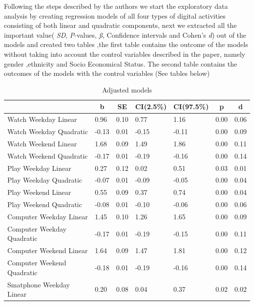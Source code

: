 \documentclass[floatsintext,man]{apa6}
\theoremstyle{definition}
\theoremstyle{definition}
\theoremstyle{definition}
\theoremstyle{remark}
\begin{document}
Following the steps described by the authors we start the exploratory
data analysis by creating regression models of all four types of digital
activities consisting of both linear and quadratic components, next we
extracted all the important value( \emph{SD}, \emph{P}-values, \emph{ß},
Confidence intervals and Cohen's \emph{d}) out of the models and created
two tables ,the first table contains the outcome of the models without
taking into account the control variables described in the paper, namely
gender ,ethnicity and Socio Economical Status. The second table contains
the outcomes of the models with the control variables (See tables below)

\begin{table}[tbp]
\begin{center}
\begin{threeparttable}
\caption{\label{tab:unnamed-chunk-1}Adjusted models}
\begin{tabular}{lllllll}
\toprule
 & \multicolumn{1}{c}{b} & \multicolumn{1}{c}{SE} & \multicolumn{1}{c}{CI(2.5\%)} & \multicolumn{1}{c}{CI(97.5\%)} & \multicolumn{1}{c}{p} & \multicolumn{1}{c}{d}\\
\midrule
Watch Weekday Linear & 0.96 & 0.10 & 0.77 & 1.16 & 0.00 & 0.06\\
Watch Weekday Quadratic & -0.13 & 0.01 & -0.15 & -0.11 & 0.00 & 0.09\\
Watch Weekend Linear & 1.68 & 0.09 & 1.49 & 1.86 & 0.00 & 0.11\\
Watch Weekend Quadratic & -0.17 & 0.01 & -0.19 & -0.16 & 0.00 & 0.14\\
Play Weekday Linear & 0.27 & 0.12 & 0.02 & 0.51 & 0.03 & 0.01\\
Play Weekday Quadratic & -0.07 & 0.01 & -0.09 & -0.05 & 0.00 & 0.04\\
Play Weekend Linear & 0.55 & 0.09 & 0.37 & 0.74 & 0.00 & 0.04\\
Play Weekend Quadratic & -0.08 & 0.01 & -0.10 & -0.06 & 0.00 & 0.06\\
Computer Weekday Linear & 1.45 & 0.10 & 1.26 & 1.65 & 0.00 & 0.09\\
Computer Weekday Quadratic & -0.17 & 0.01 & -0.19 & -0.15 & 0.00 & 0.11\\
Computer Weekend Linear & 1.64 & 0.09 & 1.47 & 1.81 & 0.00 & 0.12\\
Computer Weekend Quadratic & -0.18 & 0.01 & -0.19 & -0.16 & 0.00 & 0.14\\
Smatphone Weekday Linear & 0.20 & 0.08 & 0.04 & 0.37 & 0.02 & 0.02\\

\end{tabular}
\end{threeparttable}
\end{center}
\end{table}
\end{document}
